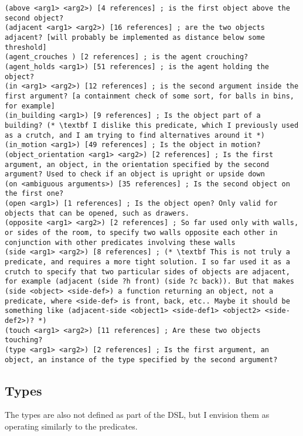 \documentclass{article}
\begin{document}
\begin{lstlisting}
(above <arg1> <arg2>) [4 references] ; is the first object above the second object?
(adjacent <arg1> <arg2>) [16 references] ; are the two objects adjacent? [will probably be implemented as distance below some threshold]
(agent_crouches ) [2 references] ; is the agent crouching?
(agent_holds <arg1>) [51 references] ; is the agent holding the object?
(in <arg1> <arg2>) [12 references] ; is the second argument inside the first argument? [a containment check of some sort, for balls in bins, for example]
(in_building <arg1>) [9 references] ; Is the object part of a building? (* \textbf I dislike this predicate, which I previously used as a crutch, and I am trying to find alternatives around it *)
(in_motion <arg1>) [49 references] ; Is the object in motion?
(object_orientation <arg1> <arg2>) [2 references] ; Is the first argument, an object, in the orientation specified by the second argument? Used to check if an object is upright or upside down
(on <ambiguous arguments>) [35 references] ; Is the second object on the first one?
(open <arg1>) [1 references] ; Is the object open? Only valid for objects that can be opened, such as drawers.
(opposite <arg1> <arg2>) [2 references] ; So far used only with walls, or sides of the room, to specify two walls opposite each other in conjunction with other predicates involving these walls
(side <arg1> <arg2>) [8 references] ; (* \textbf This is not truly a predicate, and requires a more tight solution. I so far used it as a crutch to specify that two particular sides of objects are adjacent, for example (adjacent (side ?h front) (side ?c back)). But that makes (side <object> <side-def>) a function returning an object, not a predicate, where <side-def> is front, back, etc.. Maybe it should be something like (adjacent-side <object1> <side-def1> <object2> <side-def2>)? *)
(touch <arg1> <arg2>) [11 references] ; Are these two objects touching?
(type <arg1> <arg2>) [2 references] ; Is the first argument, an object, an instance of the type specified by the second argument?
\end{lstlisting}



\subsection{Types}
The types are also not defined as part of the DSL, but I envision them as operating similarly to the predicates. \\
            
\end{document}

